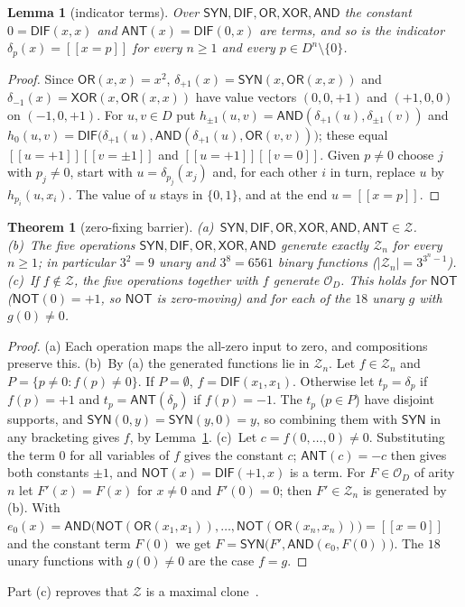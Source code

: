 \documentclass[conference]{IEEEtran}
\newcommand{\D}{D}
\newcommand{\SYN}{\mathsf{SYN}}
\newcommand{\DIF}{\mathsf{DIF}}
\newcommand{\OR}{\mathsf{OR}}
\newcommand{\XOR}{\mathsf{XOR}}
\newcommand{\AND}{\mathsf{AND}}
\newcommand{\NOT}{\mathsf{NOT}}
\newcommand{\ANT}{\mathsf{ANT}}
\newcommand{\Z}{\mathcal Z}
\newcommand{\OD}{\mathcal{O}_{\D}}
\newcommand{\iv}[1]{[\![#1]\!]}
\newtheorem{theorem}{Theorem}
\newtheorem{lemma}{Lemma}
\theoremstyle{remark}
\begin{document}
	\begin{lemma}[indicator terms]\label{lem:ind}
		Over $\SYN,\DIF,\OR,\XOR,\AND$ the constant $0=\DIF(x,x)$ and $\ANT(x)=\DIF(0,x)$ are terms, and so is the indicator $\delta_p(x)=\iv{x=p}$ for every $n\ge1$ and every $p\in\D^n\setminus\{0\}$.
	\end{lemma}
	\begin{proof}
		Since $\OR(x,x)=x^2$, $\delta_{+1}(x)=\SYN(x,\OR(x,x))$ and $\delta_{-1}(x)=\XOR(x,\OR(x,x))$ have value vectors $(0,0,+1)$ and $(+1,0,0)$ on $(-1,0,+1)$. For $u,v\in\D$ put $h_{\pm1}(u,v)=\AND(\delta_{+1}(u),\delta_{\pm1}(v))$ and $h_0(u,v)=\DIF\big(\delta_{+1}(u),\AND(\delta_{+1}(u),\OR(v,v))\big)$; these equal $\iv{u=+1}\iv{v=\pm1}$ and $\iv{u=+1}\iv{v=0}$. Given $p\neq0$ choose $j$ with $p_j\ne0$, start with $u=\delta_{p_j}(x_j)$ and, for each other $i$ in turn, replace $u$ by $h_{p_i}(u,x_i)$. The value of $u$ stays in $\{0,1\}$, and at the end $u=\iv{x=p}$.
	\end{proof}
	
	\begin{theorem}[zero-fixing barrier]\label{thm:zero}
		(a)~$\SYN,\DIF,\OR,\XOR,\AND,\ANT\in\Z$. (b)~The five operations $\SYN,\DIF,\OR,\XOR,\AND$ generate exactly $\Z_n$ for every $n\ge1$; in particular $3^2=9$ unary and $3^8=6561$ binary functions ($|\Z_n|=3^{3^n-1}$). (c)~If $f\notin\Z$, the five operations together with $f$ generate $\OD$. This holds for $\NOT$ ($\NOT(0)=+1$, so $\NOT$ is \emph{zero-moving}) and for each of the $18$ unary $g$ with $g(0)\ne0$.
	\end{theorem}
	\begin{proof}
		(a) Each operation maps the all-zero input to zero, and compositions preserve this. (b)~By (a) the generated functions lie in $\Z_n$. Let $f\in\Z_n$ and $P=\{p\neq0:f(p)\neq0\}$. If $P=\emptyset$, $f=\DIF(x_1,x_1)$. Otherwise let $t_p=\delta_p$ if $f(p)=+1$ and $t_p=\ANT(\delta_p)$ if $f(p)=-1$. The $t_p$ ($p\in P$) have disjoint supports, and $\SYN(0,y)=\SYN(y,0)=y$, so combining them with $\SYN$ in any bracketing gives $f$, by Lemma~\ref{lem:ind}. (c)~Let $c=f(0,\dots,0)\ne0$. Substituting the term $0$ for all variables of $f$ gives the constant $c$; $\ANT(c)=-c$ then gives both constants $\pm1$, and $\NOT(x)=\DIF(+1,x)$ is a term. For $F\in\OD$ of arity $n$ let $F'(x)=F(x)$ for $x\ne0$ and $F'(0)=0$; then $F'\in\Z_n$ is generated by (b). With $e_0(x)=\AND\big(\NOT(\OR(x_1,x_1)),\dots,\NOT(\OR(x_n,x_n))\big)=\iv{x=0}$ and the constant term $F(0)$ we get $F=\SYN\big(F',\AND(e_0,F(0))\big)$. The $18$ unary functions with $g(0)\ne0$ are the case $f=g$.
	\end{proof}
	Part (c) reproves that $\Z$ is a maximal clone~\cite{rosenberg1970,lau2006}.
	
\end{document}
